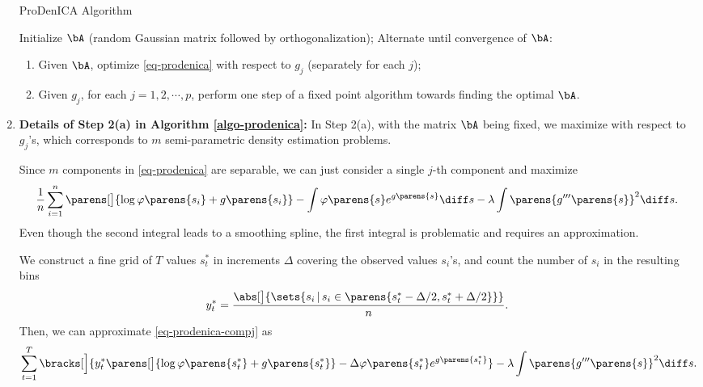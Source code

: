\documentclass[12pt]{article}
\begin{document}
\begin{enumerate}[label=\textbf{\arabic*.}]
	\begin{minipage}{\linewidth}
		\begin{algorithm}[H]
		\caption{ProDenICA Algorithm}\label{algo-prodenica}
		\begin{algorithmic}[1]
		\STATE Initialize $\bA$ (random Gaussian matrix followed by orthogonalization); 
		\STATE Alternate until convergence of $\bA$: 
		\begin{enumerate}
			\item Given $\bA$, optimize \eqref{eq-prodenica} with respect to $g_j$ (separately for each $j$); 
			\item Given $g_j$, for each $j = 1, 2, \cdots, p$, perform one step of a fixed point algorithm towards finding the optimal $\bA$. 
		\end{enumerate}
		\end{algorithmic}
		\end{algorithm}
	\end{minipage}
	
	\item \textbf{Details of Step 2(a) in Algorithm \ref{algo-prodenica}:} In Step 2(a), with the matrix $\bA$ being fixed, we maximize with respect to $g_j$'s, which corresponds to $m$ semi-parametric density estimation problems. 
	
	Since $m$ components in \eqref{eq-prodenica} are separable, we can just consider a single $j$-th component and maximize 
	\begin{align}\label{eq-prodenica-compj}
		\frac{1}{n} \sum_{i=1}^n \parens[\big]{\log \varphi \parens{s_i} + g \parens{s_i}} - \int \varphi \parens{s} e^{g \parens{s}} \diff s - \lambda \int \parens{g''' \parens{s}}^2 \diff s. 
	\end{align}
	Even though the second integral leads to a smoothing spline, the first integral is problematic and requires an approximation. 
	
	We construct a fine grid of $T$ values $s^*_t$ in increments $\Delta$ covering the observed values $s_i$'s, and count the number of $s_i$ in the resulting bins 
	\begin{align*}
		y_t^* = \frac{\abs[\big]{\sets{s_i \,\vert\, s_i \in \parens{s^*_t - \Delta / 2, s^*_t + \Delta / 2}}}}{n}. 
	\end{align*}
	Then, we can approximate \eqref{eq-prodenica-compj} as 
	\begin{align*}
		\sum_{t=1}^T \bracks[\Big]{y_t^* \parens[\big]{\log \varphi \parens{s_t^*} + g \parens{s_t^*}} - \Delta \varphi \parens{s_t^*} e^{g \parens{s_t^*}} } - \lambda \int \parens{g''' \parens{s}}^2 \diff s. 
	\end{align*}
	

\end{enumerate}
\end{document}
